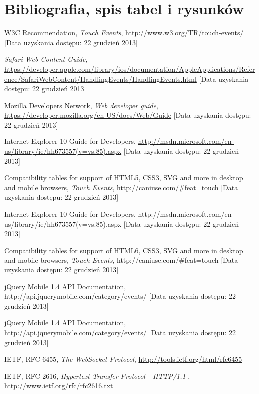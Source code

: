 \section{Bibliografia, spis tabel i rysunków}

\begin{thebibliography}{1}

   W3C Recommendation, {\em Touch Events}, \url{http://www.w3.org/TR/touch-events/} [Data uzyskania dostępu: 22 grudzień 2013]
  
   {\em Safari Web Content Guide}, \url{https://developer.apple.com/library/ios/documentation/AppleApplications/Reference/SafariWebContent/HandlingEvents/HandlingEvents.html} [Data uzyskania dostępu: 22 grudzień 2013]
  
   Mozilla Developers Network, {\em Web developer guide}, \url{https://developer.mozilla.org/en-US/docs/Web/Guide} [Data uzyskania dostępu: 22 grudzień 2013]
  
   Internet Explorer 10 Guide for Developers, \url{http://msdn.microsoft.com/en-us/library/ie/hh673557(v=vs.85).aspx} [Data uzyskania dostępu: 22 grudzień 2013]
  
   Compatibility tables for support of HTML5, CSS3, SVG and more in desktop and mobile browsers, {\em Touch Events}, \url{http://caniuse.com/\#feat=touch} [Data uzyskania dostępu: 22 grudzień 2013]
  
   Internet Explorer 10 Guide for Developers, http://msdn.microsoft.com/en-us/library/ie/hh673557(v=vs.85).aspx [Data uzyskania dostępu: 22 grudzień 2013]
  
   Compatibility tables for support of HTML6, CSS3, SVG and more in desktop and mobile browsers, {\em Touch Events}, http://caniuse.com/\#feat=touch [Data uzyskania dostępu: 22 grudzień 2013]
  
   jQuery Mobile 1.4 API Documentation, http://api.jquerymobile.com/category/events/ [Data uzyskania dostępu: 22 grudzień 2013]
  
   jQuery Mobile 1.4 API Documentation, \url{http://api.jquerymobile.com/category/events/} [Data uzyskania dostępu: 22 grudzień 2013]
  
   IETF, RFC-6455, \emph{The WebSocket Protocol}, \url{http://tools.ietf.org/html/rfc6455}
  
   IETF, RFC-2616, \emph{Hypertext Transfer Protocol - HTTP/1.1} , \url{http://www.ietf.org/rfc/rfc2616.txt}
  

\end{thebibliography}
